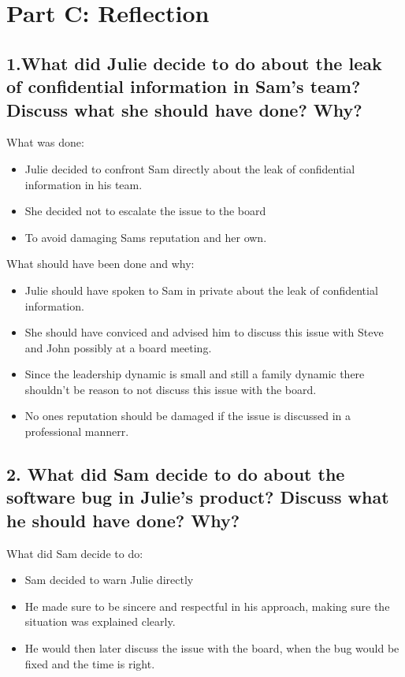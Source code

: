 \documentclass[a4paper,10pt]{article}
\begin{document}
\section{Part C: Reflection}
\subsection{1.What did Julie decide to do about the leak of confidential information in Sam’s team? Discuss what she should have done? Why?}

What was done:
\begin{itemize}
    \item Julie decided to confront Sam directly about the leak of confidential information in his team.
    \item She decided not to escalate the issue to the board
    \item To avoid damaging Sams reputation and her own.
\end{itemize}

What should have been done and why:
\begin{itemize}
    \item Julie should have spoken to Sam in private about the leak of confidential information.
    \item She should have conviced and advised him to discuss this issue with Steve and John possibly at a board meeting.
    \item Since the leadership dynamic is small and still a family dynamic there shouldn't be reason to not discuss this issue with the board. 
    \item No ones reputation should be damaged if the issue is discussed in a professional mannerr.
\end{itemize}

\subsection{2. What did Sam decide to do about the software bug in Julie’s product? Discuss what he should have done? Why?}

What did Sam decide to do:
\begin{itemize}
    \item Sam decided to warn Julie directly
    \item He made sure to be sincere and respectful in his approach, making sure the situation was explained clearly.
    \item He would then later discuss the issue with the board, when the bug would be fixed and the time is right.
\end{itemize}
\end{document}
